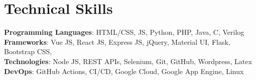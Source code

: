 \section{Technical Skills}
 \begin{itemize}[leftmargin=0.15in, label={}]
    \small{\item{
     \textbf{Programming Languages}{: HTML/CSS, JS, Python, PHP, Java, C, Verilog} \\
     \textbf{Frameworks}{: Vue JS, React JS, Express JS, jQuery, Material UI, Flask, Bootstrap CSS, } \\
     \textbf{Technologies}{: Node JS, REST APIs, Selenium, Git, GitHub, Wordpress, Latex } \\
     \textbf{DevOps}{: GitHub Actions, CI/CD, Google Cloud, Google App Engine, Linux}
    }}
 \end{itemize} 